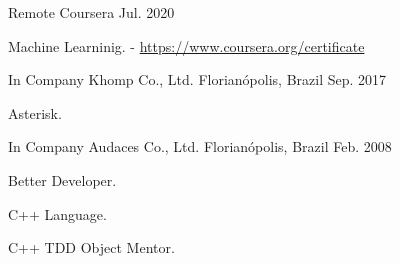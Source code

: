 

\begin{cventries}

  \cventry
    {Remote} %
    {Coursera} %
    {} %
    {Jul. 2020} %
    {
      \begin{cvitems} %
        \item {Machine Learninig. - \href{https://www.coursera.org/account/accomplishments/verify/5NJPRHSN2QG5/}{https://www.coursera.org/certificate} }
      \end{cvitems}
    }

  \cventry
    {In Company} %
    {Khomp Co., Ltd.} %
    {Florianópolis, Brazil} %
    {Sep. 2017} %
    {
      \begin{cvitems} %
        \item {Asterisk.}
      \end{cvitems}
    }

  \cventry
    {In Company} %
    {Audaces Co., Ltd.} %
    {Florianópolis, Brazil} %
    {Feb. 2008} %
    {
      \begin{cvitems} %
        \item {Better Developer.}
        \item {C++ Language.}
        \item {C++ TDD Object Mentor.}
      \end{cvitems}
    }

\end{cventries}
